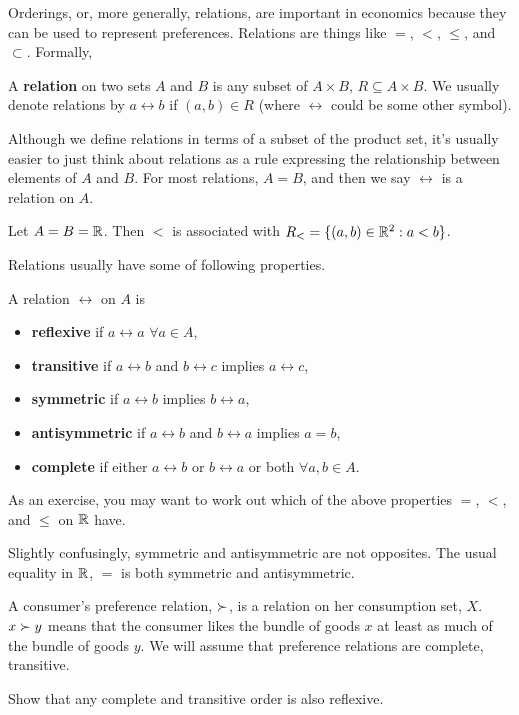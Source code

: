Orderings, or, more generally, relations, are important in economics
because they can be used to represent preferences. Relations are
things like $=$, $<$, $\leq$, and $\subset$. Formally,
\begin{definition}[Relation]
  A \textbf{relation} on two sets $A$ and $B$ is any subset of $A
  \times B$, $R \subseteq A \times B$. We usually denote relations by
  $a \rel b$ if $(a,b) \in R$ (where $\rel$ could be some other symbol).
\end{definition}
Although we define relations in terms of a subset of the product set,
it's usually easier to just think about relations as a rule expressing
the relationship between elements of $A$ and $B$. 
For most relations, $A=B$, and then we say $\rel$ is a relation on $A$. 
\begin{example}
  Let $A=B=\mathbb{R}$. Then $<$ is associated with $R_{<} = \{(a,b) \in \mathbb{R}^2
  : a<b \}$. 
\end{example}
Relations usually have some of following properties.
\begin{definition}  
  A relation $\rel$ on $A$ is 
  \begin{itemize}
  \item \textbf{reflexive} if $a \rel a$ $\forall a \in A$,
  \item \textbf{transitive} if $a \rel b$ and $b \rel c$ implies
    $a \rel c$,
  \item \textbf{symmetric} if $a \rel b$ implies $b \rel a$,
  \item \textbf{antisymmetric} if $a \rel b$ and $b \rel a$
    implies $a=b$,
  \item \textbf{complete} if either $a \rel b$ or $b \rel a$ or
    both $\forall a, b \in A$. 
  \end{itemize}
\end{definition}
\begin{exercise}
  As an exercise, you may want to work out which of the above
  properties $=$, $<$, and $\leq$ on $\mathbb{R}$ have.
\end{exercise}
Slightly confusingly, symmetric and antisymmetric are not
opposites. The usual equality in $\mathbb{R}$, $=$ is both symmetric and
antisymmetric.
\begin{example} 
  A consumer's preference relation, $\succ$, is a relation on her
  consumption set, $X$. $x \succ y$ means that the consumer likes the
  bundle of goods $x$ at least as much of the bundle of goods $y$. We
  will assume that preference relations are complete,
  transitive.  
\end{example}
\begin{exercise}
  Show that any complete and transitive order is also reflexive.
\end{exercise}

